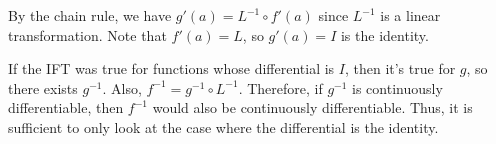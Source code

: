 \documentclass{article}
\begin{document}
\begin{enumerate}
\begin{center}
    \end{center}
    By the chain rule, we have $g'(a) = L^{-1} \circ f'(a)$ since $L^{-1}$ is a linear transformation. Note that $f'(a) = L$, so $g'(a) = I$ is the identity.

    If the IFT was true for functions whose differential is $I$, then it's true for $g$, so there exists $g^{-1}$. Also, $f^{-1} = g^{-1} \circ L^{-1}.$ Therefore, if $g^{-1}$ is continuously differentiable, then $f^{-1}$ would also be continuously differentiable. Thus, it is sufficient to only look at the case where the differential is the identity.
\end{enumerate}
\end{document}
